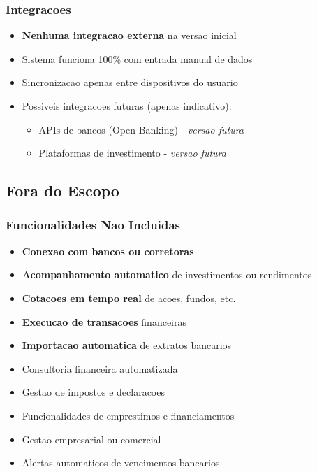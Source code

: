 \subsubsection{Integracoes}
\begin{itemize}
    \item \textbf{Nenhuma integracao externa} na versao inicial
    \item Sistema funciona 100\% com entrada manual de dados
    \item Sincronizacao apenas entre dispositivos do usuario
    \item Possiveis integracoes futuras (apenas indicativo):
    \begin{itemize}
        \item APIs de bancos (Open Banking) - \textit{versao futura}
        \item Plataformas de investimento - \textit{versao futura}
    \end{itemize}
\end{itemize}

\subsection{Fora do Escopo}

\subsubsection{Funcionalidades Nao Incluidas}
\begin{itemize}
    \item \textbf{Conexao com bancos ou corretoras}
    \item \textbf{Acompanhamento automatico} de investimentos ou rendimentos
    \item \textbf{Cotacoes em tempo real} de acoes, fundos, etc.
    \item \textbf{Execucao de transacoes} financeiras
    \item \textbf{Importacao automatica} de extratos bancarios
    \item Consultoria financeira automatizada
    \item Gestao de impostos e declaracoes
    \item Funcionalidades de emprestimos e financiamentos
    \item Gestao empresarial ou comercial
    \item Alertas automaticos de vencimentos bancarios
\end{itemize}

